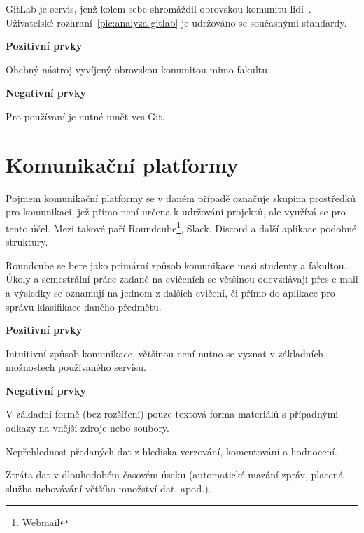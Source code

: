 GitLab je servis, jenž kolem sebe shromáždil obrovskou komunitu lidí~\cite{gitlabSource}. Uživatelské rozhraní~\ref{pic:analyza-gitlab} je udržováno se současnými standardy.

\textbf{Pozitivní prvky}
\begin{ul}
\tightlist
   \item Ohebný nástroj vyvíjený obrovskou komunitou mimo fakultu.
\end{ul}

\textbf{Negativní prvky}
\begin{ul}
   \item Pro používaní je nutné umět \gls{vcs} Git.
\end{ul}




\section{Komunikační platformy}

Pojmem komunikační platformy se v daném případě označuje skupina prostředků pro komunikaci, jež přímo není určena k udržování projektů, ale využívá se pro tento účel. Mezi takové paří Roundcube\footnote{Webmail}, Slack, Discord a další aplikace podobné struktury.

Roundcube se bere jako primární způsob komunikace mezi studenty a fakultou. Úkoly a semestrální práce zadané na cvičeních se většinou odevzdávají přes e-mail a výsledky se oznamují na jednom z dalších cvičení, či přímo do aplikace pro správu klasifikace daného předmětu.

\textbf{Pozitivní prvky}
\begin{ul}
   \item Intuitivní způsob komunikace, většinou není nutno se vyznat v základních možnostech používaného servisu.
\end{ul}

\textbf{Negativní prvky}
\begin{ul}
   \item V základní formě (bez rozšíření) pouze textová forma materiálů s případnými odkazy na vnější zdroje nebo soubory.
   \item Nepřehlednost předaných dat z hlediska verzování, komentování a hodnocení.
   \item Ztráta dat v dlouhodobém časovém úseku (automatické mazání zpráv, placená služba uchovávání většího množství dat, apod.).
\end{ul}


